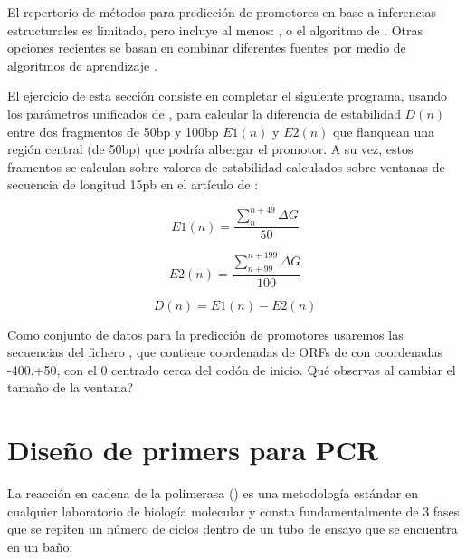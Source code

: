 El repertorio de m\'{e}todos para predicci\'{o}n de promotores en base a inferencias estructurales es limitado, pero incluye al menos: 
, 
o el algoritmo de \citet{Song2012}. Otras opciones recientes se basan en combinar diferentes fuentes por medio de algoritmos de aprendizaje \citep{Eser2016}.

El ejercicio de esta secci\'{o}n consiste en completar el siguiente programa, usando los par\'{a}metros unificados de \cite{SantaLucia1998},
para calcular la diferencia de estabilidad $D(n)$ entre dos fragmentos de 50bp y 100bp $E1(n)$ y $E2(n)$ 
que flanquean una regi\'{o}n central (de 50bp) que podr\'{i}a albergar el promotor.
A su vez, estos framentos se calculan sobre valores de estabilidad calculados sobre ventanas de secuencia 
de longitud 15pb en el art\'{i}culo de \cite{Kanhere2005}:

\begin{equation}
E1(n) = \frac{\sum_{n}^{n+49}\Delta G}{50} 
\end{equation}

\begin{equation}
E2(n) = \frac{\sum_{n+99}^{n+199}\Delta G}{100} 
\end{equation}

\begin{equation}
D(n) = E1(n) - E2(n)
\end{equation}

Como conjunto de datos para la predicci\'{o}n de promotores usaremos las secuencias del fichero , 
que contiene coordenadas de ORFs de  con coordenadas -400,+50, con el 0 centrado cerca del cod\'{o}n de inicio.
Qu\'{e} observas al cambiar el tama\~no de la ventana?

\section{Dise\~no de primers para PCR} \label{dna2}

La reacci\'{o}n en cadena de la polimerasa 
()
es una metodolog\'{i}a est\'{a}ndar en cualquier laboratorio de biolog\'{i}a molecular y consta fundamentalmente
de 3 fases que se repiten un n\'{u}mero de ciclos dentro de un tubo de ensayo que se encuentra en un ba\~{n}o:

